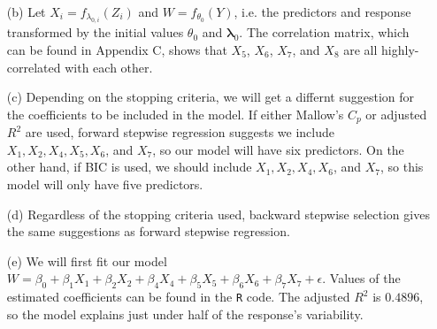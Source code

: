 \documentclass[10pt]{article}
\begin{document}
\begin{itemize}
    \item[(b)] Let \(X_i = f_{\lambda_{0,i}}(Z_i)\) and \(W = f_{\theta_0}(Y)\), i.e. the predictors and response transformed by the initial values \(\theta_0\)
    and \(\bm{\lambda}_0\). 
    The correlation matrix, which can be found in Appendix C, shows that 
    \(X_5\), \(X_6\), \(X_7\), and \(X_8\) are all highly-correlated with each other. 

    \item[(c)] Depending on the stopping criteria, we will get a differnt suggestion for the coefficients to be included in the model. If either Mallow's \(C_p\)
    or adjusted \(R^2\) are used, forward stepwise regression suggests we include \(X_1, X_2, X_4, X_5, X_6\), and \(X_7\), so our model will have six predictors.
    On the other hand, if BIC is used, we should include \(X_1, X_2, X_4, X_6\), and \(X_7\), so this model will only have five predictors.

    \item[(d)] Regardless of the stopping criteria used, backward stepwise selection gives the same suggestions as forward stepwise regression. 

    \item[(e)] We will first fit our model \(W = \beta_0 + \beta_1 X_1 + \beta_2 X_2 + \beta_4 X_4 + \beta_5 X_5 + \beta_6 X_6 + \beta_7 X_7 + \epsilon \). 
    Values of the estimated coefficients can be found in the \texttt{R} code. The adjusted \(R^2\) is \(0.4896\), so the model explains just under half of the 
    response's variability. 
\end{itemize}

\end{document}
